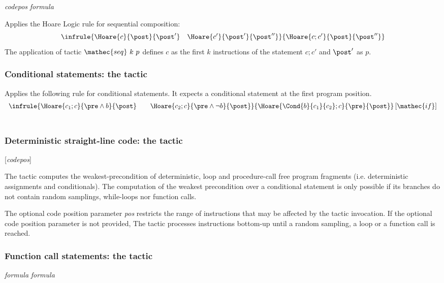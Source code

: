 \Syntax 
{} \textit{codepos} \textit{formula} 

\Description
Applies the Hoare Logic rule for sequential composition:
$$
\infrule{\Hoare{c}{\post}{\post'} \quad
         \Hoare{c'}{\post'}{\post''}}
        {\Hoare{c;c'}{\post}{\post''}}
$$
The application of tactic $\mathec{seq}\ k\ p$ defines $c$ as the first
$k$ instructions of the statement $c;c'$ and $\post'$ as
$p$.

\subsubsection*{Conditional statements: the  tactic}
%
Applies the following rule for conditional statements. It expects a
conditional statement at the first program position.
\begin{displaymath}
\begin{array}{c}
  \infrule{
    \Hoare{c_1;c}{\pre \land b}{\post}\qquad
    \Hoare{c_2;c}{\pre \land \neg b}{\post}
  }{
    \Hoare{\Cond{b}{c_1}{c_2};c}{\pre}{\post}
  }\left[\mathec{if} \right] 
\\[4ex]
\end{array}
\end{displaymath}

\subsubsection*{Deterministic straight-line code: the  tactic}

\Syntax {} [\textit{codepos}]

\Description The  tactic computes the weakest-precondition of
deterministic, loop and procedure-call free program fragments
(i.e. deterministic assignments and conditionals).   
The computation of the weakest precondition over a
conditional statement is only possible if its branches do not
contain random samplings, while-loops nor function calls.

The optional code position parameter \textit{pos} restricts the range
of instructions that may be affected by the tactic invocation. 
%
If the optional code position parameter is not provided, The tactic
processes instructions bottom-up until a random sampling, a loop or a
function call is reached.

\subsubsection*{Function call statements: the  tactic}
%
\Syntax {} \textit{formula} \textit{formula}
\Description


